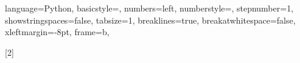 \usepackage{xparse}

\usepackage{tabto}

\newcommand{\slide}[2][]{
    \begin{frame}
        \frametitle{
            #1
        }

        #2
    \end{frame}
}

\newcommand{\eq}[2]{
    \begin{equation}\label{#1}
        #2
    \end{equation}
}

\newcommand{\R}{\mathbb{R}}
\newcommand{\Rn}[1][n]{\mathbb{R}^#1}


\renewcommand{\listfigurename}{Figures}

\lstset
{
    language=Python,
    basicstyle=\footnotesize,
    numbers=left,
    numberstyle=\tiny,
    stepnumber=1,
    showstringspaces=false,
    tabsize=1,
    breaklines=true,
    breakatwhitespace=false,
    xleftmargin=-8pt,
    frame=b,
}

\newcommand{\codefile}[3]{
    \mdframed[roundcorner=5pt, backgroundcolor=blue!30]
    
    \endmdframed
}
\newcommand{\figref}[1]{Figure \ref{#1}}
\newcommand{\codefilelines}[5]{
    \mdframed[roundcorner=5pt, backgroundcolor=blue!30]
    
    \endmdframed
}
[2]
{
    \mdframed[roundcorner=5pt, backgroundcolor=blue!30]
}
{
    \endmdframed
}
